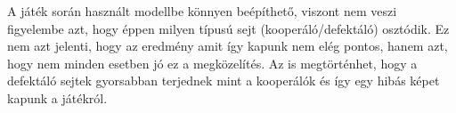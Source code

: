 A játék során használt modellbe könnyen beépíthető, viszont nem veszi figyelembe azt, hogy éppen milyen típusú sejt (kooperáló/defektáló) osztódik. Ez nem azt jelenti, hogy az eredmény amit így kapunk nem elég pontos, hanem azt, hogy nem minden esetben jó ez a megközelítés. Az is megtörténhet, hogy a defektáló sejtek gyorsabban terjednek mint a kooperálók és így egy hibás képet kapunk a játékról.